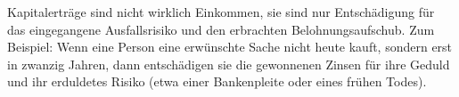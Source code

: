 Kapitalerträge sind nicht wirklich Einkommen, sie sind nur Entschädigung für das eingegangene Ausfallsrisiko und den erbrachten Belohnungsaufschub.
Zum Beispiel: Wenn eine Person eine erwünschte Sache nicht heute kauft, sondern erst in zwanzig Jahren, dann entschädigen sie die gewonnenen Zinsen für ihre Geduld und ihr erduldetes Risiko (etwa einer Bankenpleite oder eines frühen Todes).